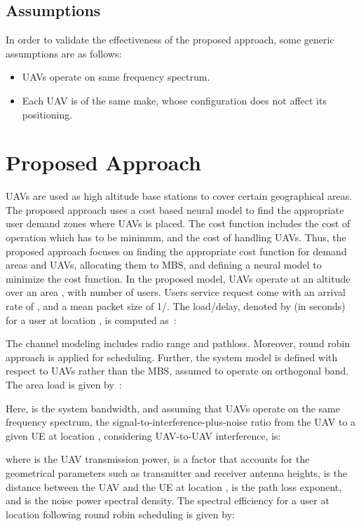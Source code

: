 \documentclass[journal]{IEEEtran}
\begin{document}
\subsection{Assumptions}
In order to validate the effectiveness of the proposed approach, some generic assumptions are as follows:
\begin{itemize}
  \item UAVs operate on same frequency spectrum.
  \item Each UAV is of the same make, whose configuration does not affect its positioning.
\end{itemize}
\section{Proposed Approach}
UAVs are used as high altitude base stations to cover certain geographical areas. The proposed approach uses a cost based neural model to find the appropriate user demand zones where UAVs is placed. The cost function includes the cost of operation which has to be minimum, and the cost of handling UAVs. Thus, the proposed approach focuses on finding the appropriate cost function for demand areas and UAVs, allocating them to MBS, and defining a neural model to minimize the cost function. In the proposed model, UAVs operate at an altitude  over an area , with  number of users. Users service request  come with an arrival rate of , and a mean packet size of 1/. The load/delay, denoted by  (in seconds) for a user at location , is computed as~\cite{samarakoon2014opportunistic}:

The channel modeling includes radio range and pathloss. Moreover, round robin approach is applied for scheduling. Further, the system model is defined with respect to UAVs rather than the MBS, assumed to operate on orthogonal band. The area load  is given by~\cite{samarakoon2014opportunistic}:

Here,  is the system bandwidth, and assuming that UAVs operate on the same frequency spectrum, the signal-to-interference-plus-noise ratio  from the  UAV to a given UE at location , considering UAV-to-UAV interference, is:

where  is the UAV transmission power,  is a factor that accounts for the geometrical parameters such as transmitter and receiver antenna heights,  is the distance between the  UAV and the UE at location ,  is the path loss exponent, and  is the noise power spectral density. The spectral efficiency  for a user at location  following round robin scheduling is given by:
\end{document}

